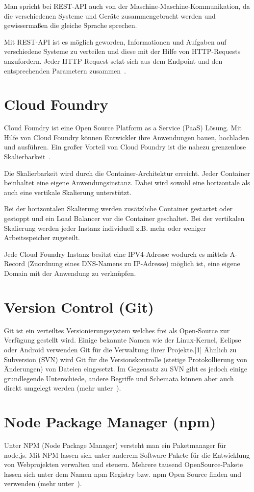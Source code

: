 Man spricht bei REST-API auch von der Maschine-Maschine-Kommunikation, da die verschiedenen Systeme und Geräte
zusammengebracht werden und gewissermaßen die gleiche Sprache sprechen.

Mit REST-API ist es möglich geworden, Informationen und Aufgaben auf verschiedene Systeme zu verteilen und diese mit der
Hilfe von HTTP-Requests anzufordern. Jeder HTTP-Request setzt sich aus dem Endpoint und den entsprechenden Parametern
zusammen~\cite{online_grundlagen_rest}.

\section{Cloud Foundry}
Cloud Foundry ist eine Open Source Platform as a Service (PaaS) Lösung. Mit Hilfe von Cloud Foundry können Entwickler
ihre Anwendungen bauen, hochladen und ausführen. Ein großer Vorteil von Cloud Foundry ist die nahezu grenzenlose
Skalierbarkeit~\cite{book_grundlagen_cloudfoundry}.

Die Skalierbarkeit wird durch die Container-Architektur erreicht. Jeder Container beinhaltet eine eigene Anwendungsinstanz.
Dabei wird sowohl eine horizontale als auch eine vertikale Skalierung unterstützt.

Bei der horizontalen Skalierung werden zusätzliche Container gestartet oder gestoppt und ein Load Balancer vor die
Container geschaltet. Bei der vertikalen Skalierung werden jeder Instanz individuell z.B. mehr oder weniger Arbeitsspeicher
zugeteilt.

Jede Cloud Foundry Instanz besitzt eine IPV4-Adresse wodurch es mittels A-Record (Zuordnung eines DNS-Namens zu IP-Adresse)
möglich ist, eine eigene Domain mit der Anwendung zu verknüpfen.

\section{Version Control (Git)}
Git ist ein verteiltes Versionierungssystem welches frei als Open-Source zur Verfügung gestellt wird. Einige bekannte
Namen wie der Linux-Kernel, Eclipse oder Android verwenden Git für die Verwaltung ihrer Projekte.[1] Ähnlich zu
Subversion (SVN) wird Git für die Versionskontrolle (stetige Protokollierung von Änderungen) von Dateien eingesetzt. Im
Gegensatz zu SVN gibt es jedoch einige grundlegende Unterschiede, andere Begriffe und Schemata können aber auch direkt
umgelegt werden (mehr unter~\cite{book_grundlagen_git}).

\section{Node Package Manager (npm)}
Unter NPM (Node Package Manager) versteht man ein Paketmanager für node.js. Mit NPM lassen sich unter anderem
Software-Pakete für die Entwicklung von Webprojekten verwalten und steuern. Mehrere tausend OpenSource-Pakete lassen sich
unter dem Namen npm Registry bzw. npm Open Source finden und verwenden (mehr unter~\cite{book_grundlagen_npm}).

